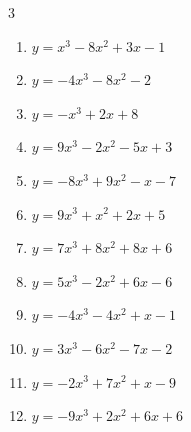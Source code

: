 \begin{multicols}{3}
\begin{enumerate}

  \item $y=x^{3}-8x^{2}+3x-1$


  \item $y=-4x^{3}-8x^{2}-2$


  \item $y=-x^{3}+2x+8$


  \item $y=9x^{3}-2x^{2}-5x+3$


  \item $y=-8x^{3}+9x^{2}-x-7$


  \item $y=9x^{3}+x^{2}+2x+5$


  \item $y=7x^{3}+8x^{2}+8x+6$


  \item $y=5x^{3}-2x^{2}+6x-6$


  \item $y=-4x^{3}-4x^{2}+x-1$


  \item $y=3x^{3}-6x^{2}-7x-2$


\columnbreak %

  \item $y=-2x^{3}+7x^{2}+x-9$


  \item $y=-9x^{3}+2x^{2}+6x+6$



\end{enumerate}
\end{multicols}
